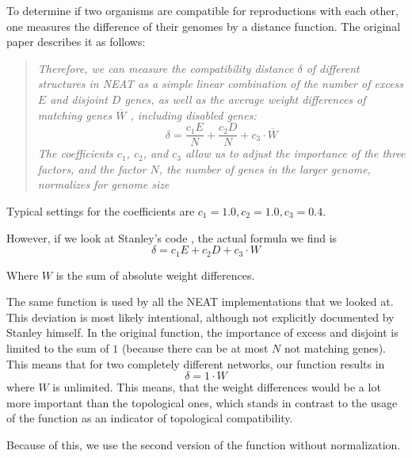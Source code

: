 To determine if two organisms are compatible for reproductions with each other, one measures the difference of their genomes by a distance function.  
The original paper describes it as follows:

\begin{quote}
	\emph{Therefore, we
		can measure the compatibility distance \(\delta\) of different structures in NEAT as a simple linear combination of the number of excess \(E\) and disjoint \(D\) genes, as well as the average weight differences of matching genes \(\overline{W}\)
		, including disabled genes:
		\[
		\delta = \frac{c_1 E}{N} + \frac{c_2 D}{N} + c_3 \cdot \overline{W} 
		\]
		The coefficients \(c_1\), \(c_2\), and \(c_3\) allow us to adjust the importance of the three factors, and the factor \(N\), the number of genes in the larger genome, normalizes for genome size}
\end{quote}  

Typical settings for the coefficients are \(c_1 = 1.0, c_2 = 1.0, c_3 = 0.4\).

\cite{Stanley2002}

However, if we look at Stanley's code \cite{Stanley2010}, the actual formula we find is
\[ \delta = c_1 E + c_2 D + c_3 \cdot W \]  

Where \(W\) is the sum of absolute weight differences.

The same function is used by all the NEAT implementations that we looked at.
This deviation is most likely intentional, although not explicitly documented by Stanley himself. In the original function, the importance of excess and disjoint is limited to the sum of \(1\) (because there can be at most \(N\) not matching genes). This means that for two completely different networks, our function results in
\[\delta = 1 \cdot W \]
where \(W\) is unlimited. This means, that the weight differences would be a lot more important than the topological ones, which stands in contrast to the usage of the function as an indicator of topological compatibility. \cite{Green2009}

Because of this, we use the second version of the function without normalization.
